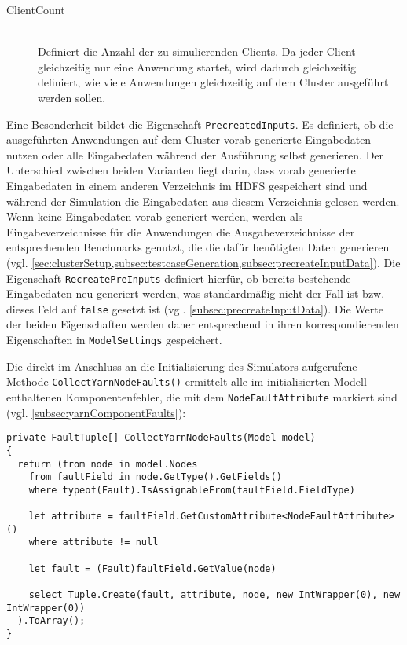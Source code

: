 \begin{description}
    \item[ClientCount] \hfill \\
        Definiert die Anzahl der zu simulierenden Clients.
        Da jeder Client gleichzeitig nur eine Anwendung startet, wird dadurch gleichzeitig definiert, wie viele Anwendungen gleichzeitig auf dem Cluster ausgeführt werden sollen.
\end{description}

Eine Besonderheit bildet die Eigenschaft \texttt{PrecreatedInputs}.
Es definiert, ob die ausgeführten Anwendungen auf dem Cluster vorab generierte Eingabedaten nutzen oder alle Eingabedaten während der Ausführung selbst generieren.
Der Unterschied zwischen beiden Varianten liegt darin, dass vorab generierte Eingabedaten in einem anderen Verzeichnis im HDFS gespeichert sind und während der Simulation die Eingabedaten aus diesem Verzeichnis gelesen werden.
Wenn keine Eingabedaten vorab generiert werden, werden als Eingabeverzeichnisse für die Anwendungen die Ausgabeverzeichnisse der entsprechenden Benchmarks genutzt, die die dafür benötigten Daten generieren (vgl. \cref{sec:clusterSetup,subsec:testcaseGeneration,subsec:precreateInputData}).
Die Eigenschaft \texttt{RecreatePreInputs} definiert hierfür, ob bereits bestehende Eingabedaten neu generiert werden, was standardmäßig nicht der Fall ist bzw. dieses Feld auf \texttt{false} gesetzt ist (vgl. \cref{subsec:precreateInputData}).
Die Werte der beiden Eigenschaften werden daher entsprechend in ihren korrespondierenden Eigenschaften in \texttt{ModelSettings} gespeichert.

Die direkt im Anschluss an die Initialisierung des Simulators aufgerufene Methode \texttt{CollectYarnNodeFaults()} ermittelt alle im initialisierten Modell enthaltenen Komponentenfehler, die mit dem \texttt{NodeFaultAttribute} markiert sind (vgl. \cref{subsec:yarnComponentFaults}):

\begin{lstlisting}[label=lst:hadoopSimulationCollectFaults,style=cs,
caption={[Ermitteln der Komponentenfehler mit dem NodeFaultAttribute]
    Ermitteln der Komponentenfehler mit dem \texttt{NodeFaultAttribute}}]
private FaultTuple[] CollectYarnNodeFaults(Model model)
{
  return (from node in model.Nodes      
    from faultField in node.GetType().GetFields()
    where typeof(Fault).IsAssignableFrom(faultField.FieldType)
    
    let attribute = faultField.GetCustomAttribute<NodeFaultAttribute>()
    where attribute != null
    
    let fault = (Fault)faultField.GetValue(node)
    
    select Tuple.Create(fault, attribute, node, new IntWrapper(0), new IntWrapper(0))
  ).ToArray();
}
\end{lstlisting}

